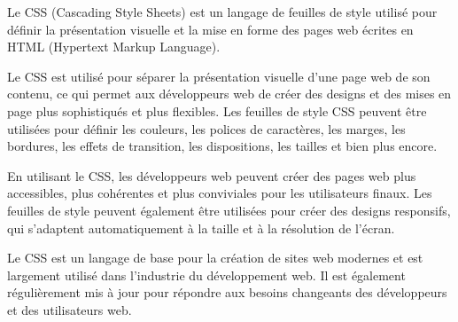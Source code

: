 Le CSS (Cascading Style Sheets) est un langage de feuilles de style utilisé pour définir la présentation visuelle et la mise en forme des pages web écrites en HTML (Hypertext Markup Language).

Le CSS est utilisé pour séparer la présentation visuelle d'une page web de son contenu, ce qui permet aux développeurs web de créer des designs et des mises en page plus sophistiqués et plus flexibles. Les feuilles de style CSS peuvent être utilisées pour définir les couleurs, les polices de caractères, les marges, les bordures, les effets de transition, les dispositions, les tailles et bien plus encore.

En utilisant le CSS, les développeurs web peuvent créer des pages web plus accessibles, plus cohérentes et plus conviviales pour les utilisateurs finaux. Les feuilles de style peuvent également être utilisées pour créer des designs responsifs, qui s'adaptent automatiquement à la taille et à la résolution de l'écran.

Le CSS est un langage de base pour la création de sites web modernes et est largement utilisé dans l'industrie du développement web. Il est également régulièrement mis à jour pour répondre aux besoins changeants des développeurs et des utilisateurs web.